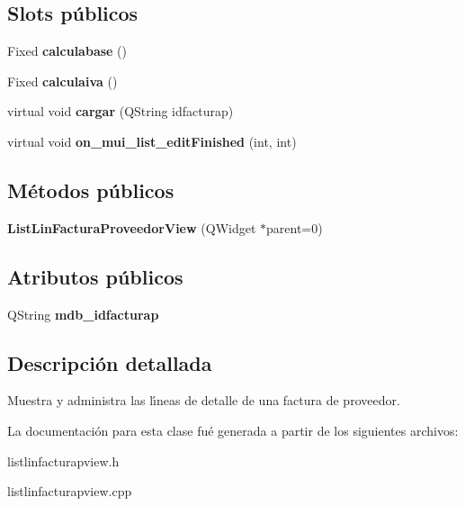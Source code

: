 \subsection*{Slots p\'{u}blicos}
\begin{CompactItemize}
\item 
Fixed {\bf calculabase} ()\label{classListLinFacturaProveedorView_i0}

\item 
Fixed {\bf calculaiva} ()\label{classListLinFacturaProveedorView_i1}

\item 
virtual void {\bf cargar} (QString idfacturap)\label{classListLinFacturaProveedorView_i2}

\item 
virtual void {\bf on\_\-mui\_\-list\_\-edit\-Finished} (int, int)\label{classListLinFacturaProveedorView_i3}

\end{CompactItemize}
\subsection*{M\'{e}todos p\'{u}blicos}
\begin{CompactItemize}
\item 
{\bf List\-Lin\-Factura\-Proveedor\-View} (QWidget $\ast$parent=0)\label{classListLinFacturaProveedorView_a0}

\end{CompactItemize}
\subsection*{Atributos p\'{u}blicos}
\begin{CompactItemize}
\item 
QString {\bf mdb\_\-idfacturap}\label{classListLinFacturaProveedorView_o0}

\end{CompactItemize}


\subsection{Descripci\'{o}n detallada}
Muestra y administra las l\'{\i}neas de detalle de una factura de proveedor. 



La documentaci\'{o}n para esta clase fu\'{e} generada a partir de los siguientes archivos:\begin{CompactItemize}
\item 
listlinfacturapview.h\item 
listlinfacturapview.cpp\end{CompactItemize}
